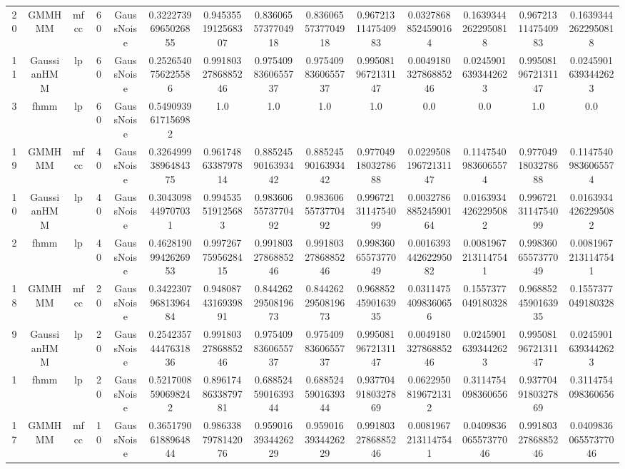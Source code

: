 \begin{table}[htb]
\begin{tabular}{@{}cccccccccccccc@{}}
        20 & GMMHMM & mfcc & 60 & GaussNoise & 0.32227396965026855 & 0.9453551912568307 & 0.8360655737704918 & 0.8360655737704918 & 0.9672131147540983 & 0.03278688524590164 & 0.16393442622950818 & 0.9672131147540983 & 0.16393442622950818 \\
        11 & GaussianHMM & lp & 60 & GaussNoise & 0.2526540756225586 & 0.9918032786885246 & 0.9754098360655737 & 0.9754098360655737 & 0.9950819672131147 & 0.004918032786885246 & 0.02459016393442623 & 0.9950819672131147 & 0.02459016393442623 \\
        3 & fhmm & lp & 60 & GaussNoise & 0.5490939617156982 & 1.0 & 1.0 & 1.0 & 1.0 & 0.0 & 0.0 & 1.0 & 0.0 \\
        19 & GMMHMM & mfcc & 40 & GaussNoise & 0.32649993896484375 & 0.9617486338797814 & 0.8852459016393442 & 0.8852459016393442 & 0.9770491803278688 & 0.022950819672131147 & 0.11475409836065574 & 0.9770491803278688 & 0.11475409836065574 \\
        10 & GaussianHMM & lp & 40 & GaussNoise & 0.3043098449707031 & 0.994535519125683 & 0.9836065573770492 & 0.9836065573770492 & 0.9967213114754099 & 0.003278688524590164 & 0.01639344262295082 & 0.9967213114754099 & 0.01639344262295082 \\
        2 & fhmm & lp & 40 & GaussNoise & 0.46281909942626953 & 0.9972677595628415 & 0.9918032786885246 & 0.9918032786885246 & 0.9983606557377049 & 0.001639344262295082 & 0.00819672131147541 & 0.9983606557377049 & 0.00819672131147541 \\
        18 & GMMHMM & mfcc & 20 & GaussNoise & 0.34223079681396484 & 0.9480874316939891 & 0.8442622950819673 & 0.8442622950819673 & 0.9688524590163935 & 0.03114754098360656 & 0.1557377049180328 & 0.9688524590163935 & 0.1557377049180328 \\
        9 & GaussianHMM & lp & 20 & GaussNoise & 0.25423574447631836 & 0.9918032786885246 & 0.9754098360655737 & 0.9754098360655737 & 0.9950819672131147 & 0.004918032786885246 & 0.02459016393442623 & 0.9950819672131147 & 0.02459016393442623 \\
        1 & fhmm & lp & 20 & GaussNoise & 0.5217008590698242 & 0.8961748633879781 & 0.6885245901639344 & 0.6885245901639344 & 0.9377049180327869 & 0.06229508196721312 & 0.3114754098360656 & 0.9377049180327869 & 0.3114754098360656 \\
        17 & GMMHMM & mfcc & 10 & GaussNoise & 0.36517906188964844 & 0.9863387978142076 & 0.9590163934426229 & 0.9590163934426229 & 0.9918032786885246 & 0.00819672131147541 & 0.040983606557377046 & 0.9918032786885246 & 0.040983606557377046 \\

\end{tabular}
\end{table}

